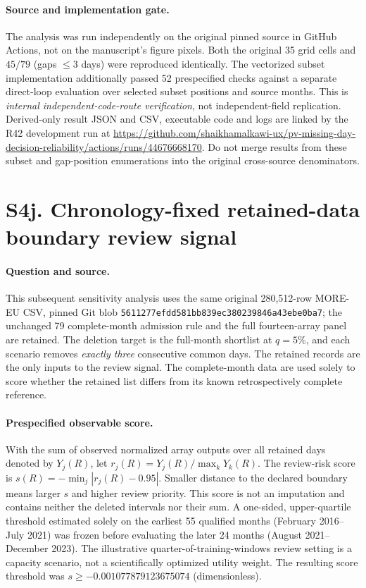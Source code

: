 \documentclass[11pt]{article}
\begin{document}
\paragraph{Source and implementation gate.} The analysis was run independently on the original pinned source in GitHub Actions, not on the manuscript's figure pixels. Both the original 35 grid cells and $45/79$ (gaps $\leq3$ days) were reproduced identically. The vectorized subset implementation additionally passed 52 prespecified checks against a separate direct-loop evaluation over selected subset positions and source months. This is \emph{internal independent-code-route verification}, not independent-field replication. Derived-only result JSON and CSV, executable code and logs are linked by the R42 development run at \url{https://github.com/shaikhamalkawi-ux/pv-missing-day-decision-reliability/actions/runs/44676668170}. Do not merge results from these subset and gap-position enumerations into the original cross-source denominators.


\section*{S4j. Chronology-fixed retained-data boundary review signal}
\paragraph{Question and source.} This subsequent sensitivity analysis uses the same original 280,512-row MORE-EU CSV, pinned Git blob \texttt{5611277efdd581bb839ec380239846a43ebe0ba7}; the unchanged 79 complete-month admission rule and the full fourteen-array panel are retained. The deletion target is the full-month shortlist at $q=5\%$, and each scenario removes \emph{exactly three} consecutive common days. The retained records are the only inputs to the review signal. The complete-month data are used solely to score whether the retained list differs from its known retrospectively complete reference.

\paragraph{Prespecified observable score.} With the sum of observed normalized array outputs over all retained days denoted by $Y_j(R)$, let $r_j(R)=Y_j(R)/\max_k Y_k(R)$. The review-risk score is $s(R)=-\min_j |r_j(R)-0.95|$. Smaller distance to the declared boundary means larger $s$ and higher review priority. This score is not an imputation and contains neither the deleted intervals nor their sum. A one-sided, upper-quartile threshold estimated solely on the earliest 55 qualified months (February 2016--July 2021) was frozen before evaluating the later 24 months (August 2021--December 2023). The illustrative quarter-of-training-windows review setting is a capacity scenario, not a scientifically optimized utility weight. The resulting score threshold was $s\ge-0.001077879123675074$ (dimensionless).
\end{document}
